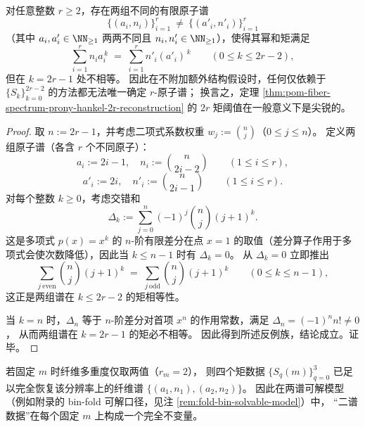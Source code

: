 \begin{theorem}\label{thm:pom-fiber-spectrum-prony-hankel-threshold-sharp}
对任意整数 \(r\ge 2\)，存在两组不同的有限原子谱
\[
\{(a_i,n_i)\}_{i=1}^{r}\ \neq\ \{(a'_i,n'_i)\}_{i=1}^{r}
\]
（其中 \(a_i,a'_i\in\NN_{\ge 1}\) 两两不同且 \(n_i,n'_i\in\NN_{\ge 1}\)），使得其幂和矩满足
\[
\sum_{i=1}^{r}n_i a_i^{\,k}
\;=\;
\sum_{i=1}^{r}n'_i (a'_i)^{\,k}
\qquad(0\le k\le 2r-2),
\]
但在 \(k=2r-1\) 处不相等。
因此在不附加额外结构假设时，任何仅依赖于 \(\{S_k\}_{k=0}^{2r-2}\) 的方法都无法唯一确定 \(r\)-原子谱；
换言之，定理 \ref{thm:pom-fiber-spectrum-prony-hankel-2r-reconstruction} 的 \(2r\) 矩阈值在一般意义下是尖锐的。
\end{theorem}
\begin{proof}
取 \(n:=2r-1\)，并考虑二项式系数权重 \(w_j:=\binom{n}{j}\)（\(0\le j\le n\)）。
定义两组原子谱（各含 \(r\) 个不同原子）：
\[
a_i:=2i-1,\quad n_i:=\binom{n}{2i-2}\qquad(1\le i\le r),
\]
\[
a'_i:=2i,\quad n'_i:=\binom{n}{2i-1}\qquad(1\le i\le r).
\]
对每个整数 \(k\ge 0\)，考虑交错和
\[
\Delta_k:=\sum_{j=0}^{n}(-1)^j\binom{n}{j}(j+1)^k.
\]
这是多项式 \(p(x)=x^k\) 的 \(n\)-阶有限差分在点 \(x=1\) 的取值（差分算子作用于多项式会使次数降低），因此当 \(k\le n-1\) 时有 \(\Delta_k=0\)。
从 \(\Delta_k=0\) 立即推出
\[
\sum_{j\ \mathrm{even}}\binom{n}{j}(j+1)^k
\;=\;
\sum_{j\ \mathrm{odd}}\binom{n}{j}(j+1)^k
\qquad(0\le k\le n-1),
\]
这正是两组谱在 \(k\le 2r-2\) 的矩相等性。
\par
当 \(k=n\) 时，\(\Delta_n\) 等于 \(n\)-阶差分对首项 \(x^n\) 的作用常数，满足 \(\Delta_n=(-1)^n n!\neq 0\)，
从而两组谱在 \(k=2r-1\) 的矩必不相等。
因此得到所述反例族，结论成立。证毕。
\end{proof}

\begin{corollary}[两谱情形的有限判别]\label{cor:pom-fiber-spectrum-two-atom-complete-invariant}
若固定 \(m\) 时纤维多重度仅取两值（\(r_m=2\)），
则四个矩数据 \(\{S_q(m)\}_{q=0}^{3}\) 已足以完全恢复该分辨率上的纤维谱 \(\{(a_1,n_1),(a_2,n_2)\}\)。
因此在两谱可解模型（例如附录的 bin-fold 可解口径，见注 \ref{rem:fold-bin-solvable-model}）中，
“二谱数据”在每个固定 \(m\) 上构成一个完全不变量。
\end{corollary}

